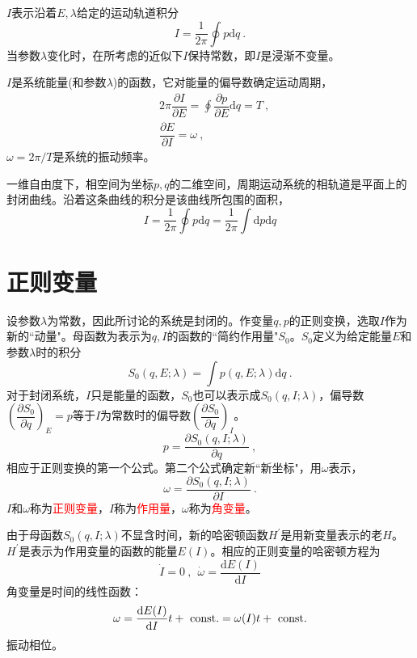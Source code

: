 \documentclass[11pt,a4paper]{article}
\newcommand{\dif}{\mathrm{d}}
\begin{document}
$I$表示沿着$E, \lambda$给定的运动轨道积分
\begin{equation}
I = \frac{1}{2\pi} \oint p \dif q ~.
\end{equation}
当参数$\lambda$变化时，在所考虑的近似下$I$保持常数，即$I$是浸渐不变量。

$I$是系统能量(和参数$\lambda$)的函数，它对能量的偏导数确定运动周期，
\begin{align}
& 2\pi \dfrac{\partial I}{\partial E} = \oint \dfrac{\partial p}{\partial E} \dif q = T ~, \\
& \dfrac{\partial E}{\partial I} = \omega ~,
\end{align}
$\omega = 2\pi /T$是系统的振动频率。

一维自由度下，相空间为坐标$p, q$的二维空间，周期运动系统的相轨道是平面上的封闭曲线。沿着这条曲线的积分是该曲线所包围的面积，
\begin{equation}
I  = \frac{1}{2\pi} \oint p \dif q = \frac{1}{2\pi} \int \dif p \dif q
\end{equation}

\section{正则变量}
设参数$\lambda$为常数，因此所讨论的系统是封闭的。作变量$q, p$的正则变换，选取$I$作为新的``动量"。母函数为表示为$q, I$的函数的``简约作用量"$S_0$。$S_0$定义为给定能量$E$和参数$\lambda$时的积分
\begin{equation}
S_0(q, E; \lambda) = \int p(q, E; \lambda) \dif q ~.
\end{equation}
对于封闭系统，$I$只是能量的函数，$S_0$也可以表示成$S_0(q, I; \lambda)$，偏导数$\left(\dfrac{\partial S_0}{\partial q} \right)_E = p$等于$I$为常数时的偏导数$\left(\dfrac{\partial S_0}{\partial q} \right)_I$。
\begin{equation}
p = \dfrac{\partial S_0(q, I; \lambda)}{\partial q} ~,
\end{equation}
相应于正则变换的第一个公式。第二个公式确定新``新坐标"，用$\omega$表示，
\begin{equation}
\omega  = \dfrac{\partial S_0(q, I; \lambda)}{\partial I} ~. 
\end{equation}
$I$和$\omega$称为\textcolor{red}{正则变量}，$I$称为\textcolor{red}{作用量}，$\omega$称为\textcolor{red}{角变量}。

由于母函数$S_0(q, I; \lambda)$不显含时间，新的哈密顿函数$H^\prime$是用新变量表示的老$H$。$H^\prime$是表示为作用变量的函数的能量$E(I)$。相应的正则变量的哈密顿方程为
\begin{equation}
\dot I = 0 ~, ~~ \dot \omega = \dfrac{\dif E(I)}{\dif I} 
\end{equation}
角变量是时间的线性函数：
\begin{equation}
\omega =  \dfrac{\dif E(I)}{\dif I} t +~{\rm const.} = \omega(I) t  +~{\rm const.} 
\end{equation}
振动相位。
\end{document}
